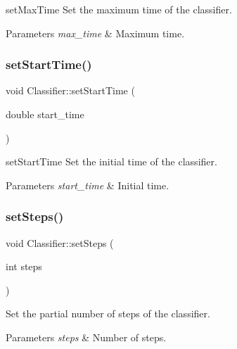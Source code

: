 set\+Max\+Time Set the maximum time of the classifier. 


\begin{DoxyParams}{Parameters}
{\em max\+\_\+time} & Maximum time. \\
\hline
\end{DoxyParams}
\mbox{\label{class_classifier_a7f1cf3ac53b0593307a050368a912bb4}} 
\subsubsection{\texorpdfstring{set\+Start\+Time()}{setStartTime()}}
{\footnotesize\ttfamily void Classifier\+::set\+Start\+Time (\begin{DoxyParamCaption}\item[{double}]{start\+\_\+time }\end{DoxyParamCaption})}



set\+Start\+Time Set the initial time of the classifier. 


\begin{DoxyParams}{Parameters}
{\em start\+\_\+time} & Initial time. \\
\hline
\end{DoxyParams}
\mbox{\label{class_classifier_a779b6cac0351e272ee0573d919d5d060}} 
\subsubsection{\texorpdfstring{set\+Steps()}{setSteps()}}
{\footnotesize\ttfamily void Classifier\+::set\+Steps (\begin{DoxyParamCaption}\item[{int}]{steps }\end{DoxyParamCaption})\hspace{0.3cm}{\ttfamily [inline]}}



Set the partial number of steps of the classifier. 


\begin{DoxyParams}{Parameters}
{\em steps} & Number of steps. \\
\hline
\end{DoxyParams}
\mbox{\label{class_classifier_a073b94029512378ccfae3aa34aae0212}} 
